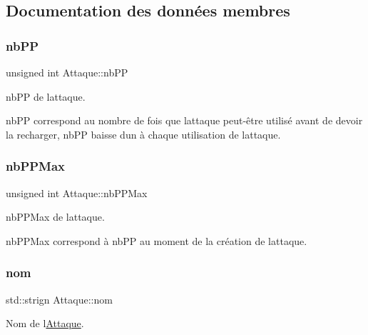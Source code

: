 \subsection{Documentation des données membres}
\mbox{\label{class_attaque_aa6b498ab7188fa4120473ea99b5dd1ab}} 
\subsubsection{\texorpdfstring{nb\+PP}{nbPP}}
{\footnotesize\ttfamily unsigned int Attaque\+::nb\+PP\hspace{0.3cm}{\ttfamily [private]}}



nb\+PP de l\textquotesingle{}attaque. 

nb\+PP correspond au nombre de fois que l\textquotesingle{}attaque peut-\/être utilisé avant de devoir la recharger, nb\+PP baisse d\textquotesingle{}un à chaque utilisation de l\textquotesingle{}attaque. \mbox{\label{class_attaque_a3103b16987d3457eef9e503d5af8bee9}} 
\subsubsection{\texorpdfstring{nb\+P\+P\+Max}{nbPPMax}}
{\footnotesize\ttfamily unsigned int Attaque\+::nb\+P\+P\+Max\hspace{0.3cm}{\ttfamily [private]}}



nb\+P\+P\+Max de l\textquotesingle{}attaque. 

nb\+P\+P\+Max correspond à nb\+PP au moment de la création de l\textquotesingle{}attaque. \mbox{\label{class_attaque_a4adbe83e5fca0bd7533b32ff382dc682}} 
\subsubsection{\texorpdfstring{nom}{nom}}
{\footnotesize\ttfamily std\+::strign Attaque\+::nom\hspace{0.3cm}{\ttfamily [private]}}



Nom de l\textquotesingle{}\hyperlink{class_attaque}{Attaque}. 

